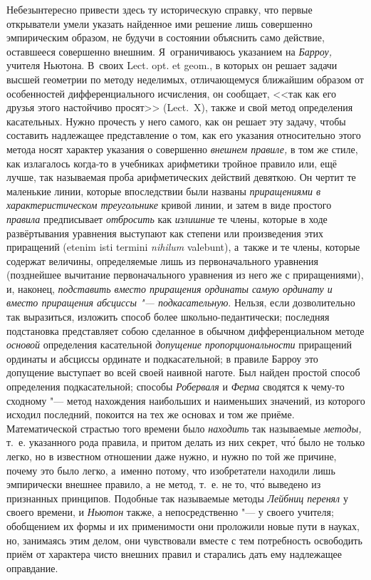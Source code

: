 Небезынтересно привести здесь ту историческую справку, что первые открыватели
умели указать найденное ими решение лишь совершенно эмпирическим образом, не
будучи в состоянии объяснить само действие, оставшееся совершенно внешним.
Я~ограничиваюсь указанием на {\em Барроу,} учителя Ньютона. В~своих Lect. opt.
et geom., в которых он решает задачи высшей геометрии по методу неделимых,
отличающемуся ближайшим образом от особенностей дифференциального исчисления,
он сообщает, <<так как его друзья этого настойчиво просят>> (Lect.~X), также и
свой метод определения касательных. Нужно прочесть у него самого, как он решает
эту задачу, чтобы составить надлежащее представление о том, как его указания
относительно этого метода носят характер указания о совершенно {\em внешнем
правиле,} в том же стиле, как излагалось когда-то в учебниках арифметики
тройное правило или, ещё лучше, так называемая проба арифметических действий
девяткою. Он чертит те маленькие линии, которые впоследствии были
названы {\em приращениями в характеристическом треугольнике} кривой линии, и
затем в виде простого {\em правила} предписывает {\em отбросить} как
{\em излишние} те члены, которые в ходе развёртывания уравнения выступают как
степени или произведения этих приращений (etenim isti termini {\em nihilum}
vale\-bunt), а~также
и те члены, которые содержат величины, определяемые лишь из первоначального
уравнения (позднейшее вычитание первоначального уравнения из него же с
приращениями), и, наконец, {\em подставить вместо приращения ординаты самую
ординату и вместо приращения абсциссы "--- подкасательную}. Нельзя, если
дозволительно так выразиться, изложить способ более школьно-педантически;
последняя подстановка представляет собою сделанное в обычном дифференциальном
методе {\em основой} определения касательной {\em допущение пропорциональности}
приращений ординаты и абсциссы ординате и подкасательной; в правиле Барроу это
допущение выступает во всей своей наивной наготе. Был найден простой способ
определения подкасательной; способы {\em Роберваля} и {\em Ферма} сводятся к
чему-то сходному "--- метод нахождения наибольших и наименьших значений, из
которого исходил последний, покоится на тех же основах и том же приёме.
Математической страстью того времени было {\em находить} так называемые
{\em методы,} т.~е. указанного рода правила, и притом делать из них секрет,
чт\'{о} было не только легко, но в известном отношении даже нужно, и нужно по
той же причине, почему это было легко, а~именно потому, что изобретатели
находили лишь эмпирически внешнее правило, а~не метод, т.~е. не то, чт\'{о}
выведено из признанных принципов. Подобные так называемые методы
{\em Лейбниц перенял} у своего времени, и {\em Ньютон} также,
а непосредственно "--- у своего учителя; обобщением их
формы и их применимости они проложили новые пути в науках, но, занимаясь этим
делом, они чувствовали вместе с тем потребность освободить приём от характера
чисто внешних правил и старались дать ему надлежащее оправдание.


